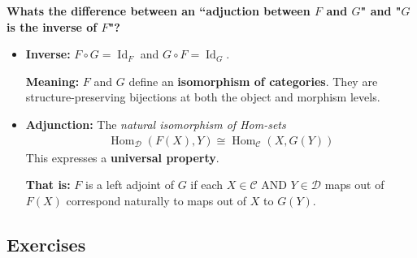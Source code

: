 \documentclass[12pt,a4paper]{report}
\newcommand{\CAT}[1]{\mathscr{#1}}
\begin{document}
\HLINE
\begin{remark}[ChatGPT] \textbf{Whats the difference between an ``adjuction between $F$ and $G$" and "$G$ is the inverse of $F$"?}  
\begin{itemize}
	\item \textbf{Inverse:} $F \circ G = \operatorname{Id}_F$ and $G \circ F = \operatorname{Id}_G$.  
	
	\textbf{Meaning: }$F$ and $G$ define an \textbf{isomorphism of categories}. They are structure-preserving bijections at both the object and morphism levels.
	
	\item \textbf{Adjunction:} The \textit{natural isomorphism of Hom-sets} 
	\begin{align*}
		\operatorname{Hom}_\CAT{D}(F(X), Y) \cong \operatorname{Hom}_\CAT{C}(X, G(Y))
	\end{align*}This expresses a \textbf{universal property}.
	
	\textbf{That is: } $F$ is a left adjoint of $G$ if each $X\in \CAT{C}$ AND $Y \in \CAT{D}$ maps out of $F(X)$ correspond naturally to maps out of $X$ to $G(Y)$.
\end{itemize}
\end{remark}
\HLINE

\subsection{Exercises}
\end{document}
